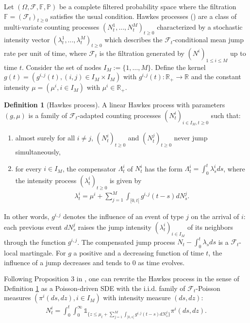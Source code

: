 \documentclass[10pt]{article}
\theoremstyle{plain}
\theoremstyle{definition}
\newtheorem{definition}[theorem]{Definition}
\newcommand{\<}{\langle}
\renewcommand{\>}{\rangle}
\renewcommand{\(}{\left(}
\renewcommand{\)}{\right)}
\renewcommand{\[}{\left[}
\renewcommand{\]}{\right]}
\def \caratt {{\mathds{1}}}
\begin{document}
Let $(\Omega,{\mathcal F},\mathbb{F},\mathbb{P})$ be a complete filtered probability space where the filtration ${\mathbb{F}}=({\mathcal{F}_t})_{t\geq0}$ satisfies 
the usual condition. Hawkes processes (\citet{hawkes71}) are a class of multi-variate counting processes
$(N_t^1,...,N_t^M)_{t\geq 0}$ characterized by a stochastic intensity vector
$(\lambda_t^1,...,\lambda_t^M)_{t\geq 0}$ which describes the $\mathcal{F}_t$-conditional mean
jump rate per unit of time, where $\mathcal{F}_t$ is the filtration generated by $(N^i)_{1\leq
i\leq M}$ up to time $t$. Consider the set of nodes $I_{M}:= \{1,\dots,M\}$. Define the kernel $g(t)=(g^{i,j}(t),
(i,j)\in I_{M}\times I_{M})$ with $g^{i,j}(t):\mathbb{R}_+\to\mathbb{R}$ and the constant
intensity $\mu=(\mu^i, i\in I_{M})$ with $\mu^i\in\mathbb{R}_+$.
\begin{definition}[Hawkes process]\label{defhawk}
A linear Hawkes process with parameters $(g,\mu)$ is a family of $\mathcal{F}_t$-adapted counting
processes $(N^i_t)_{i\in I_{M},t\geq 0}$ such that:
\begin{enumerate}
\item almost surely for all $i\neq j$, $(N_t^i)_{t\geq 0}$ and $(N_t^j)_{t\geq 0}$ never jump simultaneously,
\item for every $i\in I_{M}$, the compensator $\Lambda_t^i$ of $N_t^i$ has the form $\Lambda_t^i=\int_0^t\lambda_s^ids$, where the intensity process $(\lambda_t^i)_{t\geq 0}$ is given by
\begin{align}\label{eq:hawkesint}
\lambda^i_t = \mu^i + \sum\limits_{j=1}^M\int_{[0,t[}g^{i,j}(t-s)dN^j_s.
\end{align}
\end{enumerate}
\end{definition}
In other words, $g^{i,j}$ denotes the influence of an event of type $j$ on the arrival of $i$:
each previous event $dN^j_s$ raises the jump intensity $(\lambda^i_t)_{i\in I_{M}}$ of its
neighbors through the function $g^{i,j}$. The compensated jump process $N_t-\int_{0}^t\lambda_sds$
is a $\mathcal{F}_t$-local martingale. For $g$ a positive and a decreasing function of time $t$,
the influence of a jump decreases and tends to 0 as time evolves.

Following Proposition 3 in \citet{delattre16}, one can rewrite the Hawkes process in the sense of
Definition \ref{defhawk} as a Poisson-driven SDE with the i.i.d. family of $\mathcal{F}_t$-Poisson
measures $(\pi^i(ds,dz), i\in I_{M})$ with intensity measure $(ds,dz)$:
\begin{align}\label{eq:hawkpoiss}
N_t^i = \int_0^t \int_0^\infty \caratt_{\{z\leq
\mu_t+\sum\limits_{j=1}^M\int_{[0,s[}g^{i,j}(t-s)dN_s^j\}}\pi^i(ds,dz).
\end{align}
\end{document}
